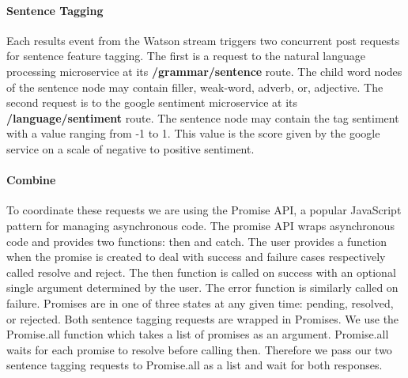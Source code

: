 \paragraph{Sentence Tagging}
Each results event from the Watson stream triggers two concurrent post requests
for sentence feature tagging. The first is a request to the natural language
processing microservice at its \textbf{/grammar/sentence} route. The child word nodes of
the sentence node may contain filler, weak-word, adverb, or, adjective. The
second request is to the google sentiment microservice at its
\textbf{/language/sentiment} route. The sentence node may contain the tag sentiment with
a value ranging from -1 to 1. This value is the score given by the google
service on a scale of negative to positive sentiment.

\paragraph{Combine}
To coordinate these requests we are using the Promise API, a popular JavaScript
pattern for managing asynchronous code. The promise API wraps asynchronous code
and provides two functions: then and catch. The user provides a function when
the promise is created to deal with success and failure cases respectively
called resolve and reject. The then function is called on success with an
optional single argument determined by the user. The error function is similarly
called on failure. Promises are in one of three states at any given time:
pending, resolved, or rejected.  Both sentence tagging requests are wrapped in
Promises. We use the Promise.all function which takes a list of promises as an
argument. Promise.all waits for each promise to resolve before calling then.
Therefore we pass our two sentence tagging requests to Promise.all as a list and
wait for both responses.

